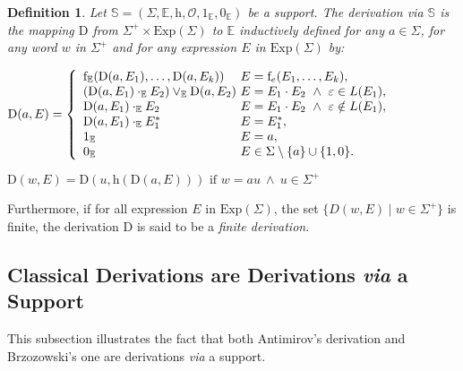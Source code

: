 \documentclass{article}
\newtheorem{definition}{Definition}
\begin{document}
  \begin{definition}
    Let $\mathbb{S}=(\Sigma,\mathbb{E},\mathrm{h},\mathcal{O},1_\mathbb{E},0_\mathbb{E})$ be a support. The \emph{derivation via} $\mathbb{S}$ is the mapping $\mathrm{D}$ from $\Sigma^{+}\times\mathrm{Exp}(\Sigma)$ to $\mathbb{E}$ inductively defined for any  $a\in \Sigma$, for any word $w$ in $\Sigma^+$ and for any expression $E$ in $\mathrm{Exp}(\Sigma)$ by:
    

    \centerline{
        $\mathrm{D}(a,E)=
          \left\{
            \begin{array}{l@{\ }l}
              \mathrm{f}_{\mathbb{E}}(\mathrm{D}(a,E_1),\ldots,\mathrm{D}(a,E_k)) &  E=\mathrm{f}_e(E_1,\ldots,E_k),\\
             (\mathrm{D}(a,E_1) \cdot_{\mathbb{E}} E_2)  \vee_{\mathbb{E}} \mathrm{D}(a,E_2) &  E=E_1\cdot E_2\ \wedge\ \varepsilon\in L(E_1),\\
              \mathrm{D}(a,E_1) \cdot_{\mathbb{E}} E_2 &  E=E_1\cdot E_2\ \wedge\ \varepsilon\notin L(E_1),\\
              \mathrm{D}(a,E_1) \cdot_{\mathbb{E}} E_1^*  &  E=E_1^*,\\
              1_\mathbb{E} & E=a,\\
              0_\mathbb{E} &  E\in\Sigma\setminus\{a\}\cup\{1,0\}.\\
            \end{array}
          \right.$
    }      
     \centerline{   $\mathrm{D}(w,E)=
                    \mathrm{D}(u,\mathrm{h}(\mathrm{D}(a,E)))  \text{ if }w=au\ \wedge\ u\in\Sigma^+$\\
       }
    
    
  \end{definition}
   
     Furthermore, if for all expression $E$ in $\mathrm{Exp}(\Sigma)$, the set $\{D(w,E)\mid w\in\Sigma^{+}\}$ is finite, the derivation $\mathrm{D}$ is said to be a \emph{finite derivation}.
     
     
  \subsection{Classical Derivations are Derivations \emph{via}  a Support} 
  
     This subsection illustrates the fact that both Antimirov's derivation and  Brzozowski's one are derivations \emph{via} a support.
     
\end{document}

